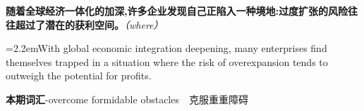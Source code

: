 \documentclass[11pt,a4paper]{article}
\newcommand{\num}[1]{\makebox[1.9em][r]{#1.}\hspace{0.3em}}
\newcommand{\prompt}[1]{\emph{\textcolor{tipblue}{\small（#1）}}}
\begin{document}
\num{4}\textbf{随着全球经济一体化的加深,许多企业发现自己正陷入一种境地:过度扩张的风险往往超过了潜在的获利空间。}\prompt{where}

\vspace{0.15em}

\noindent\hangindent=2.2em\hspace{2.2em}With global economic integration deepening, many enterprises find themselves trapped in a situation where the risk of overexpansion tends to outweigh the potential for profits.

\vspace{0.4em}\noindent{\color{rulegray}\rule{\textwidth}{0.6pt}}\vspace{0.4em}

\num{5}\textbf{本期词汇}\quad -overcome formidable obstacles　克服重重障碍
\end{document}
